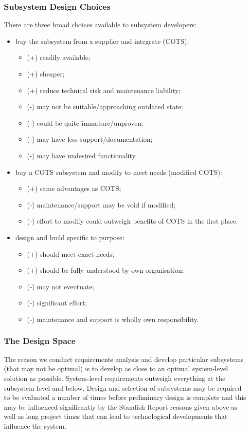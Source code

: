 \documentclass[journal]{IEEEtran}
\begin{document}
\subsubsection{Subsystem Design Choices}
There are three broad choices available to subsystem developers:
\begin{itemize}
	\item buy the subsystem from a supplier and integrate (COTS):
	\begin{itemize}
		\item (+) readily available;
		\item (+) cheaper;
		\item (+) reduce technical risk and maintenance liability;
		\item (-) may not be suitable/approaching outdated state;
		\item (-) could be quite immature/unproven;
		\item (-) may have less support/documentation;
		\item (-) may have undesired functionality.
	\end{itemize}
	\item buy a COTS subsystem and modify to meet needs (modified COTS):
	\begin{itemize}
		\item (+) same advantages as COTS;
		\item (-) maintenance/support may be void if modified;
		\item (-) effort to modify could outweigh benefits of COTS in the first place.
	\end{itemize}
	\item design and build specific to purpose:
	\begin{itemize}
		\item (+) should meet exact needs;
		\item (+) should be fully understood by own organisation;
		\item (-) may not eventuate;
		\item (-) significant effort;
		\item (-) maintenance and support is wholly own responsibility.
	\end{itemize}
\end{itemize}
\subsubsection{The Design Space}
The reason we conduct requirements analysis and develop particular subsystems (that may not be optimal) is to develop as close to an optimal system-level solution as possible. System-level requirements outweigh everything at the subsystem level and below. Design and selection of subsystems may be required to be evaluated a number of times before preliminary design is complete and this may be influenced significantly by the Standish Report reasons given above as well as long project times that can lead to technological developments that influence the system.
\end{document}
